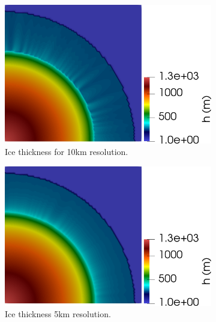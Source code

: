 \documentclass{article}
\begin{document}
\begin{figure}[!h]
	\centering %
	\begin{minipage}[t]{.45\textwidth}
		\begin{subfigure}{\textwidth}
			\includegraphics[width=\linewidth]{../fig/10km_quarter_h_thickness_sin_fondo.png}
			\caption{Ice thickness for 10km resolution.}
			\label{h10km}
		\end{subfigure}\hfil %
		\begin{subfigure}{\textwidth}
			\includegraphics[width=\linewidth]{../fig/5km_quarter_h_thickness_sin_fondo.png}
			\caption{Ice thickness 5km resolution.}
			\label{h5km}
		\end{subfigure}\hfil %
		\begin{subfigure}{\textwidth}

\end{subfigure}
\end{minipage}
\end{figure}
\end{document}
